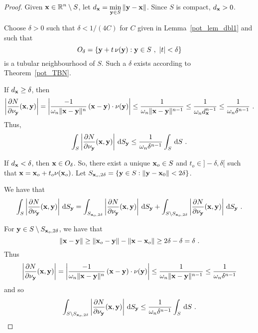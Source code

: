 \begin{proof}
Given $\displaystyle \mathbf{x} \in \mathbb{R}^n\setminus S$, let
$\displaystyle d_{\mathbf{x}} = \min_{\mathbf{y} \in S}\|\mathbf{y} - \mathbf{x}\|$.
Since $S$ is compact, $\displaystyle d_{\mathbf{x}} >0$.

Choose $\delta >0$ such that $\delta < 1/(4C)$ for $C$ given in
Lemma~\ref{pot_lem_dbl1} and such that
\[
O_{\delta} = \left\{ \mathbf{y} + t\, \mathbf{\nu}(\mathbf{y}) : \mathbf{y} \in S \ ,
\ |t|<\delta \right\}
\]
is a tubular neighbourhood of $S$.  Such a $\delta$ exists according
to Theorem~\ref{pot_TBN}.

 If $\displaystyle d_{\mathbf{x}} \geq \delta$, then
\[
\left| \frac{\partial{N}}{\partial \mathbf{\nu}_{\mathbf{y}}}(\mathbf{x},\mathbf{y})\right| 
= \left| \frac{-1}{\omega_n \|\mathbf{x}-\mathbf{y}\|^n}\,(\mathbf{x}-\mathbf{y})
\cdot \mathbf{\nu}(\mathbf{y}) \right|
\leq \frac{1}{\omega_n \|\mathbf{x}-\mathbf{y}\|^{n-1}}
\leq \frac{1}{\omega_n d_{\mathbf{x}}^{n-1}}
\leq \frac{1}{\omega_n \delta^{n-1}} \ .
\]
Thus,
\begin{equation} \label{Bounddny1}
\int_S \left| \pdydx{N}{\VEC{\nu}_{\VEC{y}}}(\VEC{x},\VEC{y})
\right| \dss{S}{y} \leq \frac{1}{\omega_n \delta^{n-1}} \int_S \dx{S} \ .
\end{equation}

  If $\displaystyle d_{\mathbf{x}} < \delta$, then
$\mathbf{x} \in O_{\delta}$.  So, there exist a unique
$\mathbf{x}_o \in S$ and $t_o \in ]-\delta,\delta[$ such
that
$\displaystyle \mathbf{x} = \mathbf{x}_o + t_o\mathbf{\nu}(\mathbf{x}_o)$.
Let $\displaystyle S_{\mathbf{x}_o,2\delta} = 
\left\{ \mathbf{y} \in S : \|\mathbf{y} - \mathbf{x}_0\| < 2\delta \right\}$.

We have that
\[
\int_S \left| \frac{\partial{N}}{\partial \mathbf{\nu}_{\mathbf{y}}}(\mathbf{x},\mathbf{y}) \right|
\,\mathrm{d}{S}_{\mathbf{y}}
= \int_{S_{\mathbf{x}_o,2\delta}}
\left| \frac{\partial{N}}{\partial \mathbf{\nu}_{\mathbf{y}}}(\mathbf{x},\mathbf{y}) \right| \,\mathrm{d}{S}_{\mathbf{y}}
+ \int_{S\setminus S_{\mathbf{x}_o,2\delta}}
\left| \frac{\partial{N}}{\partial \mathbf{\nu}_{\mathbf{y}}}(\mathbf{x},\mathbf{y}) \right|
\,\mathrm{d}{S}_{\mathbf{y}} \ .
\]

For $\mathbf{y} \in S \setminus S_{\mathbf{x}_o,2\delta}$, we have that
\[
\|\mathbf{x} - \mathbf{y} \|
\geq \|\mathbf{x}_o-\mathbf{y}\| - \|\mathbf{x}-\mathbf{x}_o\|
\geq 2\delta - \delta = \delta \ .
\]
Thus
\[
\left| \frac{\partial{N}}{\partial \mathbf{\nu}_{\mathbf{y}}}(\mathbf{x},\mathbf{y})\right| 
= \left| \frac{-1}{\omega_n \|\mathbf{x}-\mathbf{y}\|^n}\,(\mathbf{x}-\mathbf{y})
\cdot \mathbf{\nu}(\mathbf{y}) \right|
\leq \frac{1}{\omega_n \|\mathbf{x}-\mathbf{y}\|^{n-1}}
\leq \frac{1}{\omega_n \delta^{n-1}}
\]
and so
\begin{equation}  \label{Bounddny2}
\int_{S\setminus S_{\mathbf{x}_o,2\delta}}
\left| \frac{\partial{N}}{\partial \mathbf{\nu}_{\mathbf{y}}}(\mathbf{x},\mathbf{y}) \right| \,\mathrm{d}{S}_{\mathbf{y}}
\leq \frac{1}{\omega_n \delta^{n-1}} \int_S \,\mathrm{d}{S} \ .
\end{equation}


\end{proof}
